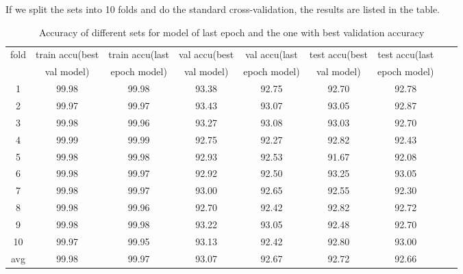 If we split the sets into 10 folds and do the standard cross-validation, the results are listed in the table.

\begin{table}[!htbp]
	\centering
	\caption{Accuracy of different sets for model of  last epoch and the one with best validation accuracy }
	\label{table:cv3}
	\begin{tabular}{|c|c|c|c|c|c|c|c|c|}
		\hline
%		
fold	&	train accu(best	&	train accu(last	&	val accu(best	&	val accu(last	&	test accu(best 	&	test accu(last	\\
	&	 val model)	&	 epoch model)	&	val model)	&	 epoch model)	&	val model)	&	 epoch model)	\\\hline
1	&	99.98	&	99.98	&	93.38	&	92.75	&	92.70	&	92.78	\\\hline
2	&	99.97	&	99.97	&	93.43	&	93.07	&	93.05	&	92.87	\\\hline
3	&	99.98	&	99.96	&	93.27	&	93.08	&	93.03	&	92.70	\\\hline
4	&	99.99	&	99.99	&	92.75	&	92.27	&	92.82	&	92.43	\\\hline
5	&	99.98	&	99.98	&	92.93	&	92.53	&	91.67	&	92.08	\\\hline
6	&	99.98	&	99.97	&	92.92	&	92.50	&	93.25	&	93.05	\\\hline
7	&	99.98	&	99.97	&	93.00	&	92.65	&	92.55	&	92.30	\\\hline
8	&	99.98	&	99.96	&	92.70	&	92.42	&	92.82	&	92.72	\\\hline
9	&	99.98	&	99.98	&	93.22	&	93.05	&	92.48	&	92.70	\\\hline
10	&	99.97	&	99.95	&	93.13	&	92.42	&	92.80	&	93.00	\\\hline
avg	&	99.98	&	99.97	&	93.07	&	92.67	&	92.72	&	92.66	\\\hline
	\end{tabular}
\end{table}


